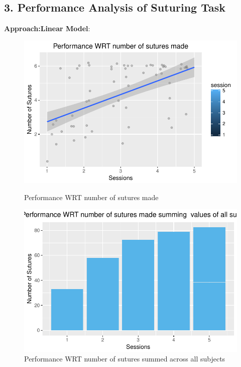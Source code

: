 \documentclass[12pt,epsf]{report}
\begin{document}
\subsection*{3. Performance Analysis of Suturing Task}
\textbf{Approach:Linear Model}:\\
\begin{figure}[!htb]
	\begin{minipage}[c]{0.5\linewidth}
	\includegraphics[width=\linewidth]{PerformanceWRTSutures.pdf}
	\caption{Performance WRT number of sutures made}
	\end{minipage}
	\hfill
	\begin{minipage}[c]{0.5\linewidth}
	\includegraphics[width=\linewidth]{PerformanceWRTSutures_bar.pdf}
	\caption{Performance WRT number of sutures summed across all subjects}
	\end{minipage}
\end{figure}
\end{document}
